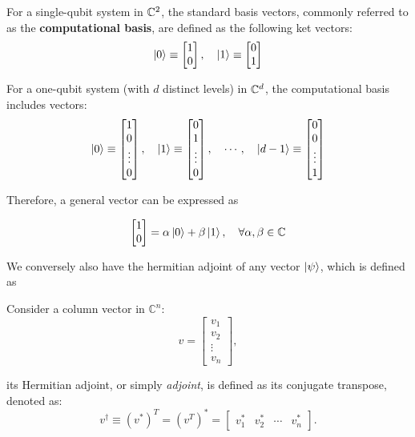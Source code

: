 \documentclass[12pt]{article}
\begin{document}
\begin{definition}
For a single-qubit system in $\mathbb{C}^2$, the standard basis vectors, commonly referred to as the \textbf{computational basis}, are defined as the following ket vectors:
\[
\ket{0} \equiv \begin{bmatrix} 1 \\ 0 \end{bmatrix}, \quad \ket{1} \equiv \begin{bmatrix} 0 \\ 1 \end{bmatrix}
\]

For a one-qubit system (with $d$ distinct levels) in $\mathbb{C}^d$, the computational basis includes vectors:
\[
\ket{0} \equiv \begin{bmatrix} 1 \\ 0 \\ \vdots \\ 0 \end{bmatrix}, \quad \ket{1} \equiv \begin{bmatrix} 0 \\ 1 \\ \vdots \\ 0 \end{bmatrix}, \quad \cdots, \quad \ket{d-1} \equiv \begin{bmatrix} 0 \\ 0 \\ \vdots \\ 1 \end{bmatrix}
\]
\end{definition}

Therefore, a general vector can be expressed as 

$$
\begin{bmatrix}
    1 \\ 0
\end{bmatrix}
= 
\alpha \ket{0}
+
 \beta \ket{1}, \quad \forall \alpha, \beta \in \mathbb{C}
$$

We conversely also have the hermitian adjoint of any vector $\ket{\psi}$, which is defined as 

\begin{definition}
    Consider a column vector in $\mathbb{C}^n$:
    \[
    v = \begin{bmatrix}
    v_1 \\
    v_2 \\
    \vdots \\
    v_n
    \end{bmatrix},
    \]

    its Hermitian adjoint, or simply \textit{adjoint}, is defined as its conjugate transpose, denoted as:
    \[
    v^\dagger \equiv (v^*)^T = (v^T)^* = \begin{bmatrix} v_1^* & v_2^* & \cdots & v_n^* \end{bmatrix}.
    \]
\end{definition}
\end{document}
